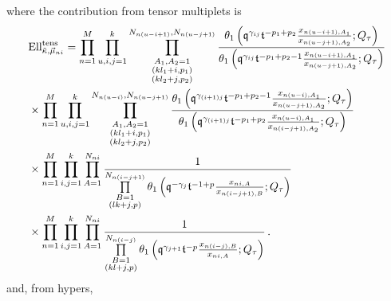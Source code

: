 \documentclass[main.tex]{subfiles}
\begin{document}
where the contribution from tensor multiplets is
\begin{align*}\label{eqn:defectyngtens}\allowdisplaybreaks
&\Ell_{\tilde{\kappa},\vec{\mu}_{ni}}^{\text{tens}}=\prod_{n=1}^M\prod_{u,i,j=1}^k\prod_{\substack{{A_1,A_2=1}\\(kl_1+i,p_1)\\(kl_2+j,p_2)}}^{N_{n(u-i+1)},N_{n(u-j+1)}}\frac{\theta_1\left(\qbf^{\gamma_{ij}}\tbf^{-p_1+p_2}\frac{x_{n(u-i+1),A_1}}{x_{n(u-j+1),A_2}};\Qtau\right)}{\theta_1\left(\qbf^{\gamma_{ij}}\tbf^{-p_1+p_2-1}\frac{x_{n(u-i+1),A_1}}{x_{n(u-j+1),A_2}};\Qtau\right)}\\
&\times\prod_{n=1}^M\prod_{u,i,j=1}^k\prod_{\substack{{A_1,A_2=1}\\(kl_1+i,p_1)\\(kl_2+j,p_2)}}^{N_{n(u-i)},N_{n(u-j+1)}}\frac{\theta_1\left(\qbf^{\gamma_{(i+1)j}}\tbf^{-p_1+p_2-1}\frac{x_{n(u-i),A_1}}{x_{n(u-j+1),A_2}};\Qtau\right)}{\theta_1\left(\qbf^{\gamma_{(i+1)j}}\tbf^{-p_1+p_2}\frac{x_{n(u-i),A_1}}{x_{n(i-j+1),A_2}};\Qtau\right)}\\
&\times\prod_{n=1}^M\prod_{i,j=1}^k\prod\limits_{A=1}^{N_{ni}}\frac{1}{\prod\limits_{\substack{{B=1}\\(lk+j,p)}}^{N_{n(i-j+1)}}\theta_1\left(\qbf^{-\gamma_j}\tbf^{-1+p}\frac{x_{ni,A}}{x_{n(i-j+1),B}};\Qtau\right)}\\
&\times\prod_{n=1}^M\prod_{i,j=1}^k\prod\limits_{A=1}^{N_{ni}}\frac{1}{\prod\limits_{\substack{{B=1}\\(kl+j,p)}}^{{N_{n(i-j)}}}\theta_1\left(\qbf^{\gamma_{j+1}}\tbf^{-p}\frac{x_{n(i-j),B}}{x_{ni,A}};\Qtau\right)}\,.
\end{align*}
and, from hypers,
\end{document}
